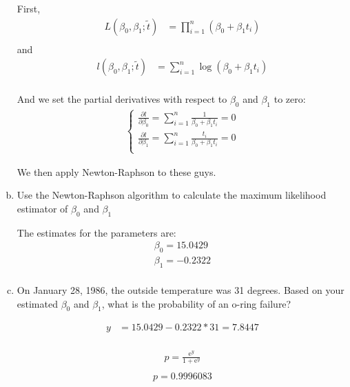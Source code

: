 \documentclass[12pt]{article}
\begin{document}
\begin{enumerate}[(a)]
First,
\begin{align*}
L(\beta_0, \beta_1 ; \tilde t) &= \prod_{i=1}^n ( \beta_0 + \beta_1 t_i )\\
\end{align*}
and
\begin{align*}
l(\beta_0, \beta_1 ; \tilde t) &= \sum_{i=1}^n \log( \beta_0 + \beta_1 t_i )\\
\end{align*}

And we set the partial derivatives with respect to $\beta_0$ and $\beta_1$ to zero:
\begin{align*}
    \begin{cases} 
         \frac {\partial l} {\partial \beta_0} = \sum_{i=1}^n \frac{1} {\beta_0 + \beta_1 t_i} = 0\\
         \frac {\partial l} {\partial \beta_1} = \sum_{i=1}^n \frac{t_i} {\beta_0 + \beta_1 t_i} = 0\\
    \end{cases}
\end{align*}


We then apply Newton-Raphson to these guys.

\item Use the Newton-Raphson algorithm to calculate the maximum likelihood estimator of $\beta_0$ and $\beta_1$

The estimates for the parameters are:
\begin{align*}
\beta_0 = 15.0429 \\
\beta_1 = -0.2322 \\
\end{align*}




\item On January 28, 1986, the outside temperature was 31 degrees. Based on your estimated $\beta_0$ and $\beta_1$, what is the probability of an o-ring failure?

\begin{align*}
y &= 15.0429 - 0.2322  * 31 = 7.8447 \\
\end{align*}

\begin{align*}
p = \frac{\mathrm{e}^y}{ 1 + {\mathrm{e}^y}}\\
\end{align*}
\begin{align*}
\boxed{p = 0.9996083}
\end{align*}



\end{enumerate}
\end{document}

